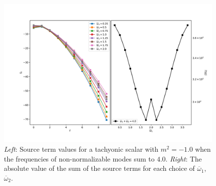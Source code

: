 \documentclass[letterpaper,11pt]{article}
\newcommand{\oone}{\overline{\omega}_1}
\newcommand{\otwo}{\overline{\omega}_2}
\begin{document}
\begin{figure}
\centering
\includegraphics[width=\textwidth]{./figures/NNAddToInteger_source_n2_m-1_0}
\caption{{\it Left}: Source term values for a tachyonic scalar with $m^2 = -1.0$ when the frequencies of non-normalizable modes sum to $4.0$. {\it Right}: The absolute value of the sum of the source terms for each choice of $\oone$, $\otwo$.}
\label{fig:atoi_all_m-4_0}
\end{figure}
\end{document}
